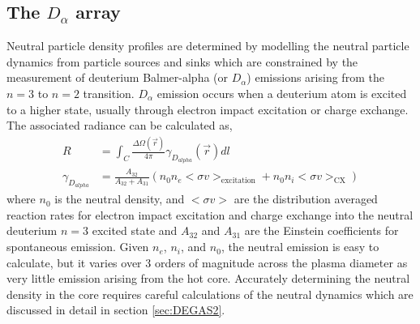 \subsection{The $D_{\alpha}$ array}\label{sec:dalpha_array}

Neutral particle density profiles are determined by modelling the neutral particle dynamics from particle sources and sinks which are constrained by the measurement of deuterium Balmer-alpha (or $D_{\alpha}$) emissions arising from the $n=3$ to $n=2$ transition. $D_{\alpha}$ emission occurs when a deuterium atom is excited to a higher state, usually through electron impact excitation or charge exchange. The associated radiance can be calculated as,
\begin{align}
    R &= \int_C \frac{\Delta \Omega(\vec{r})}{4\pi}\gamma_{D_{alpha}}(\vec{r}) dl\\
    \gamma_{D_{alpha}} &= \frac{A_{32}}{ A_{32} + A_{31} }\left( n_0 n_e <\sigma v>_{\text{excitation}} + n_0 n_i <\sigma v>_{\text{CX}} \right)
\end{align}
where $n_0$ is the neutral density, and $<\sigma v>$ are the distribution averaged reaction rates for electron impact excitation and charge exchange into the neutral deuterium $n=3$ excited state and $A_{32}$ and $A_{31}$ are the Einstein coefficients for spontaneous emission. Given $n_e$, $n_i$, and $n_0$, the neutral emission is easy to calculate, but it varies over $3$ orders of magnitude across the plasma diameter as very little emission arising from the hot core. Accurately determining the neutral density in the core requires careful calculations of the neutral dynamics which are discussed in detail in section \ref{sec:DEGAS2}.


